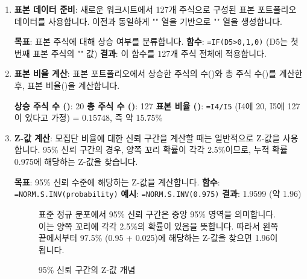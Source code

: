 \documentclass[11pt,a4paper]{article}
\theoremstyle{definition}
\newcommand{\code}[1]{\texttt{#1}}
\begin{document}
\begin{enumerate}
    \item \textbf{표본 데이터 준비}:
    새로운 워크시트에서 127개 주식으로 구성된 표본 포트폴리오 데이터를 사용합니다. 이전과 동일하게 "" 열을 기반으로 "" 열을 생성합니다.
    \begin{examplebox}[title=Excel IF 함수 (표본 데이터)]
        \textbf{목표}: 표본 주식에 대해 상승 여부를 분류합니다.
        \textbf{함수}: \code{=IF(D5>0,1,0)} (D5는 첫 번째 표본 주식의 "" 값)
        \textbf{결과}: 이 함수를 127개 주식 전체에 적용합니다.
    \end{examplebox}

    \item \textbf{표본 비율 계산}:
    표본 포트폴리오에서 상승한 주식의 수()와 총 주식 수()를 계산한 후, 표본 비율()을 계산합니다.
    \begin{examplebox}[title=표본 비율 계산 결과]
        \textbf{상승 주식 수 ()}: 20
        \textbf{총 주식 수 ()}: 127
        \textbf{표본 비율 ()}: \code{=I4/I5} (I4에 20, I5에 127이 있다고 가정) = 0.15748, 즉 약 15.75\%
    \end{examplebox}

    \item \textbf{Z-값 계산}:
    모집단 비율에 대한 신뢰 구간을 계산할 때는 일반적으로 Z-값을 사용합니다. 95\% 신뢰 구간의 경우, 양쪽 꼬리 확률이 각각 2.5\%이므로, 누적 확률 0.975에 해당하는 Z-값을 찾습니다.
    \begin{examplebox}[title=Excel NORM.S.INV 함수 사용법]
        \textbf{목표}: 95\% 신뢰 수준에 해당하는 Z-값을 계산합니다.
        \textbf{함수}: \code{=NORM.S.INV(probability)}
        \textbf{예시}: \code{=NORM.S.INV(0.975)}
        \textbf{결과}: 1.9599 (약 1.96)
    \end{examplebox}
    \begin{figure}[h!]
        \centering
        \begin{infobox}[title=Z-값 시각적 설명]
            표준 정규 분포에서 95\% 신뢰 구간은 중앙 95\% 영역을 의미합니다. 이는 양쪽 꼬리에 각각 2.5\%의 확률이 있음을 뜻합니다. 따라서 왼쪽 끝에서부터 97.5\% (0.95 + 0.025)에 해당하는 Z-값을 찾으면 1.96이 됩니다.
        \end{infobox}
        \caption{95\% 신뢰 구간의 Z-값 개념}
        \label{fig:z_value_concept}
    \end{figure}


\end{enumerate}
\end{document}
